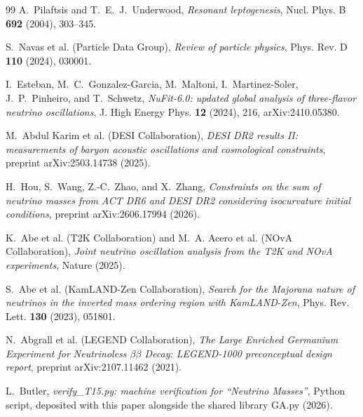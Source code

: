 \documentclass[11pt]{article}
\theoremstyle{definition}
\begin{document}
\begin{thebibliography}{99}
A.~Pilaftsis and T.~E.~J.~Underwood,
\emph{Resonant leptogenesis},
Nucl. Phys. B \textbf{692} (2004), 303--345.

S.~Navas et al. (Particle Data Group),
\emph{Review of particle physics},
Phys. Rev. D \textbf{110} (2024), 030001. %

I.~Esteban, M.~C.~Gonzalez-Garcia, M.~Maltoni, I.~Martinez-Soler, J.~P.~Pinheiro, and T.~Schwetz,
\emph{NuFit-6.0: updated global analysis of three-flavor neutrino oscillations},
J. High Energy Phys. \textbf{12} (2024), 216, arXiv:2410.05380. %

M.~Abdul Karim et al. (DESI Collaboration),
\emph{DESI DR2 results II: measurements of baryon acoustic oscillations and cosmological constraints},
preprint arXiv:2503.14738 (2025). %

H.~Hou, S.~Wang, Z.-C.~Zhao, and X.~Zhang,
\emph{Constraints on the sum of neutrino masses from ACT DR6 and DESI DR2 considering isocurvature initial conditions},
preprint arXiv:2606.17994 (2026). %

K.~Abe et al. (T2K Collaboration) and M.~A. Acero et al. (NOvA Collaboration),
\emph{Joint neutrino oscillation analysis from the T2K and NOvA experiments},
Nature (2025). %

S.~Abe et al. (KamLAND-Zen Collaboration),
\emph{Search for the Majorana nature of neutrinos in the inverted mass ordering region with KamLAND-Zen},
Phys. Rev. Lett. \textbf{130} (2023), 051801. %

N.~Abgrall et al. (LEGEND Collaboration),
\emph{The Large Enriched Germanium Experiment for Neutrinoless $\beta\beta$ Decay: LEGEND-1000 preconceptual design report},
preprint arXiv:2107.11462 (2021). %

L.~Butler,
\emph{verify\_T15.py: machine verification for ``Neutrino Masses''},
Python script, deposited with this paper alongside the shared library GA.py (2026).

\end{thebibliography}
\end{document}
